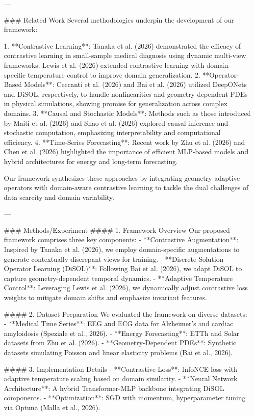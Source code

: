 ---

### Related Work
Several methodologies underpin the development of our framework:

1. **Contrastive Learning**: Tanaka et al. (2026) demonstrated the efficacy of contrastive learning in small-sample medical diagnosis using dynamic multi-view frameworks. Lewis et al. (2026) extended contrastive learning with domain-specific temperature control to improve domain generalization.
2. **Operator-Based Models**: Ceccanti et al. (2026) and Bai et al. (2026) utilized DeepONets and DiSOL, respectively, to handle nonlinearities and geometry-dependent PDEs in physical simulations, showing promise for generalization across complex domains.
3. **Causal and Stochastic Models**: Methods such as those introduced by Maiti et al. (2026) and Shao et al. (2026) explored causal inference and stochastic computation, emphasizing interpretability and computational efficiency.
4. **Time-Series Forecasting**: Recent work by Zhu et al. (2026) and Chen et al. (2026) highlighted the importance of efficient MLP-based models and hybrid architectures for energy and long-term forecasting.

Our framework synthesizes these approaches by integrating geometry-adaptive operators with domain-aware contrastive learning to tackle the dual challenges of data scarcity and domain variability.

---

### Methods/Experiment
#### 1. Framework Overview
Our proposed framework comprises three key components:
- **Contrastive Augmentation**: Inspired by Tanaka et al. (2026), we employ domain-specific augmentations to generate contextually discrepant views for training.
- **Discrete Solution Operator Learning (DiSOL)**: Following Bai et al. (2026), we adapt DiSOL to capture geometry-dependent temporal dynamics.
- **Adaptive Temperature Control**: Leveraging Lewis et al. (2026), we dynamically adjust contrastive loss weights to mitigate domain shifts and emphasize invariant features.

#### 2. Dataset Preparation
We evaluated the framework on diverse datasets:
- **Medical Time Series**: EEG and ECG data for Alzheimer's and cardiac amyloidosis (Speziale et al., 2026).
- **Energy Forecasting**: ETTh and Solar datasets from Zhu et al. (2026).
- **Geometry-Dependent PDEs**: Synthetic datasets simulating Poisson and linear elasticity problems (Bai et al., 2026).

#### 3. Implementation Details
- **Contrastive Loss**: InfoNCE loss with adaptive temperature scaling based on domain similarity.
- **Neural Network Architecture**: A hybrid Transformer-MLP backbone integrating DiSOL components.
- **Optimization**: SGD with momentum, hyperparameter tuning via Optuna (Malla et al., 2026).

